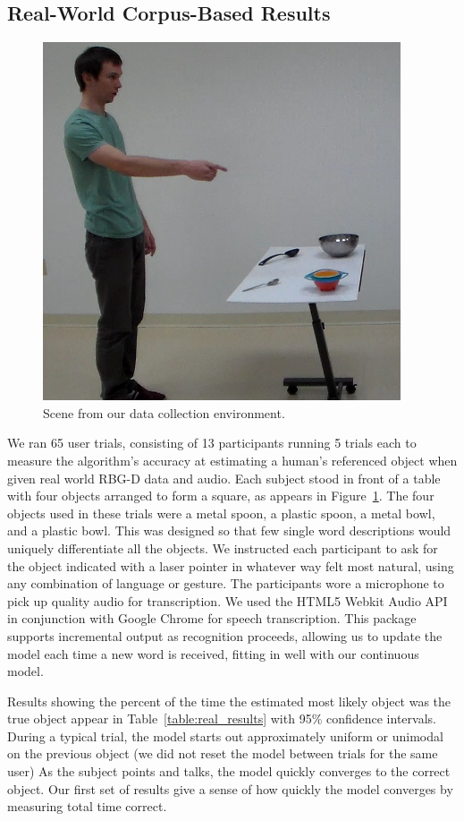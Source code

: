 \documentclass[a4paper, 11pt]{article} %
\begin{document}
\subsection{Real-World Corpus-Based Results}
\begin{figure}
\centering
\includegraphics[width=0.5\linewidth]{images/dataset.png}
\caption{Scene from our data collection environment.\label{fig:corpus_scene}}
\end{figure}

We ran 65 user trials, consisting of 13 participants running 5 trials each to measure the algorithm's accuracy at estimating a human's referenced object when given real world RBG-D data and audio. Each subject stood in front of a table with four objects arranged to form a square, as appears in Figure~\ref{fig:corpus_scene}. The four objects used in these trials were a metal spoon, a plastic spoon, a metal bowl, and a plastic bowl. This was designed so that few single word descriptions would uniquely differentiate all the objects. We instructed each participant to ask for the object indicated with a laser pointer in whatever way felt most natural, using any combination of language or gesture. The participants wore a microphone to pick up quality audio for transcription. We used the HTML5 Webkit Audio API in conjunction with Google Chrome for speech transcription. This package supports incremental output as recognition proceeds, allowing us to update the model each time a new word is received, fitting in well with our continuous model.

Results showing the percent of the time the estimated most likely
object was the true object appear in Table~\ref{table:real_results}
with 95\% confidence intervals.  During a typical trial, the model
starts out approximately uniform or unimodal on the previous object
(we did not reset the model between trials for the same user) As the subject points and
talks, the model quickly converges to the correct object.  Our first
set of results give a sense of how quickly the model converges by measuring total time correct.
\end{document}
